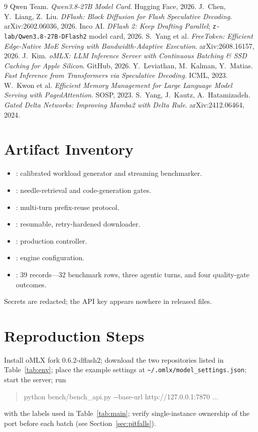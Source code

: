 \documentclass[11pt]{article}
\newcommand{\omlx}{oMLX}
\begin{document}
\begin{thebibliography}{9}
 Qwen Team. \emph{Qwen3.8-27B Model Card}. Hugging Face, 2026.
 J.~Chen, Y.~Liang, Z.~Liu. \emph{DFlash: Block Diffusion for Flash Speculative Decoding}. arXiv:2602.06036, 2026.
 Inco AI. \emph{DFlash 2: Keep Drafting Parallel}; \texttt{z-lab/Qwen3.8-27B-DFlash2} model card, 2026.
 S.~Yang et al. \emph{FreeToken: Efficient Edge-Native MoE Serving with Bandwidth-Adaptive Execution}. arXiv:2608.16157, 2026.
 J.~Kim. \emph{oMLX: LLM Inference Server with Continuous Batching \& SSD Caching for Apple Silicon}. GitHub, 2026.
 Y.~Leviathan, M.~Kalman, Y.~Matias. \emph{Fast Inference from Transformers via Speculative Decoding}. ICML, 2023.
 W.~Kwon et al. \emph{Efficient Memory Management for Large Language Model Serving with PagedAttention}. SOSP, 2023.
 S.~Yang, J.~Kautz, A.~Hatamizadeh. \emph{Gated Delta Networks: Improving Mamba2 with Delta Rule}. arXiv:2412.06464, 2024.
\end{thebibliography}

\appendix
\section{Artifact Inventory}
\begin{itemize}
\item {}: calibrated workload generator and streaming benchmarker.
\item {}: needle-retrieval and code-generation gates.
\item {}: multi-turn prefix-reuse protocol.
\item {}: resumable, retry-hardened downloader.
\item {}: production controller.
\item {}: engine configuration.
\item {}: 39 records---32 benchmark rows, three agentic turns, and four quality-gate outcomes.
\end{itemize}
Secrets are redacted; the API key appears nowhere in released files.

\section{Reproduction Steps}
Install \omlx{} fork 0.6.2-dflash2; download the two repositories listed in
Table~\ref{tab:env}; place the example settings at
\verb|~/.omlx/model_settings.json|; start the server; run
\begin{quote}\small\ttfamily
python bench/bench\_api.py -{}-base-url http://127.0.0.1:7870 ...
\end{quote}
with the labels used in Table~\ref{tab:main}; verify single-instance ownership of the
port before each batch (see Section~\ref{sec:pitfalls}).
\end{document}
